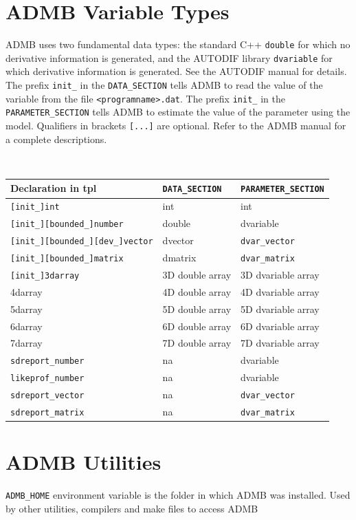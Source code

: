 \documentclass[a4paper,10pt,notumble]{leaflet}
\begin{document}
\section{ADMB Variable Types}
ADMB uses two fundamental data types: the standard C++
\verb+double+ for which no derivative information is generated, and the
AUTODIF library \verb+dvariable+ for which derivative information is
generated. See the AUTODIF manual for details. The prefix
\verb+init_+ in the \verb+DATA_SECTION+ tells ADMB to read
the value of the variable from the file \verb+<programname>.dat+. The prefix
\verb+init_+ in the \verb+PARAMETER_SECTION+ tells ADMB to
estimate the value of the parameter using the model. Qualifiers in
brackets \verb+[...]+ are optional. Refer to the ADMB manual for a
complete descriptions.
{\scriptsize
\begin{center}
{\tt
\begin{tabular}{@{}lll@{}}
\hline
Declaration in tpl & \verb+DATA_SECTION+ & \verb+PARAMETER_SECTION+\\
\hline
\verb+[init_]int+ & int & int\\
\verb+[init_][bounded_]number+  & double & dvariable\\
\verb+[init_][bounded_][dev_]vector+ & dvector & \verb+dvar_vector+\\
\verb+[init_][bounded_]matrix+ & dmatrix & \verb+dvar_matrix+\\
\verb+[init_]3darray+ & 3D double array & 3D dvariable array\\
4darray & 4D double array & 4D dvariable array\\
5darray & 5D double array & 5D dvariable array\\
6darray & 6D double array & 6D dvariable array\\
7darray & 7D double array & 7D dvariable array\\
\verb+sdreport_number+ & na & dvariable\\
\verb+likeprof_number+ & na & dvariable\\
\verb+sdreport_vector+ & na & \verb+dvar_vector+\\
\verb+sdreport_matrix+ & na & \verb+dvar_matrix+\\
\hline
\end{tabular}
}
\end{center}
}

\section {ADMB Utilities}
\verb+ADMB_HOME+ environment variable is the folder in which ADMB was
installed. Used by other utilities, compilers and make files to
access ADMB
\end{document}
